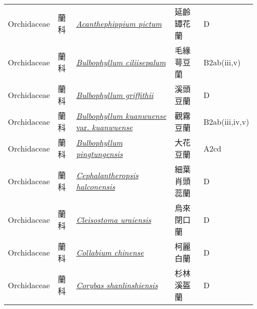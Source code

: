 {\begin{longtable}{p{2.5cm}p{2.5cm}p{4.5cm}p{2.5cm}p{3cm}}
    Orchidaceae & 蘭科 & \href{http://www.theplantlist.org/tpl1.1/search?q=Acanthephippium+pictum}{\textit{Acanthephippium pictum} } & 延齡罈花蘭 & D \index{Acanthephippium@\textit{Acanthephippium}!pictum@\textit{pictum}}  \index{延齡罈花蘭} \\
    Orchidaceae & 蘭科 & \href{http://www.theplantlist.org/tpl1.1/search?q=Bulbophyllum+ciliisepalum}{\textit{Bulbophyllum ciliisepalum} } & 毛緣萼豆蘭 & B2ab(iii,v) \index{Bulbophyllum@\textit{Bulbophyllum}!ciliisepalum@\textit{ciliisepalum}}  \index{毛緣萼豆蘭} \\
    Orchidaceae & 蘭科 & \href{http://www.theplantlist.org/tpl1.1/search?q=Bulbophyllum+griffithii}{\textit{Bulbophyllum griffithii} } & 溪頭豆蘭 & D \index{Bulbophyllum@\textit{Bulbophyllum}!griffithii@\textit{griffithii}}  \index{溪頭豆蘭} \\
    Orchidaceae & 蘭科 & \href{http://www.theplantlist.org/tpl1.1/search?q=Bulbophyllum+kuanwuense+var.+kuanwuense}{\textit{Bulbophyllum kuanwuense} var. \textit{kuanwuense} } & 觀霧豆蘭 & B2ab(iii,iv,v) \index{Bulbophyllum@\textit{Bulbophyllum}!kuanwuense@\textit{kuanwuense}!var. kuanwuense@var. \textit{kuanwuense}}  \index{觀霧豆蘭} \\
    Orchidaceae & 蘭科 & \href{http://www.theplantlist.org/tpl1.1/search?q=Bulbophyllum+pingtungensis}{\textit{Bulbophyllum pingtungensis} } & 大花豆蘭 & A2cd \index{Bulbophyllum@\textit{Bulbophyllum}!pingtungensis@\textit{pingtungensis}}  \index{大花豆蘭} \\
    Orchidaceae & 蘭科 & \href{http://www.theplantlist.org/tpl1.1/search?q=Cephalantheropsis+halconensis}{\textit{Cephalantheropsis halconensis} } & 細葉肖頭蕊蘭 & D \index{Cephalantheropsis@\textit{Cephalantheropsis}!halconensis@\textit{halconensis}}  \index{細葉肖頭蕊蘭} \\
    Orchidaceae & 蘭科 & \href{http://www.theplantlist.org/tpl1.1/search?q=Cleisostoma+uraiensis}{\textit{Cleisostoma uraiensis} } & 烏來閉口蘭 & D \index{Cleisostoma@\textit{Cleisostoma}!uraiensis@\textit{uraiensis}}  \index{烏來閉口蘭} \\
    Orchidaceae & 蘭科 & \href{http://www.theplantlist.org/tpl1.1/search?q=Collabium+chinense}{\textit{Collabium chinense} } & 柯麗白蘭 & D \index{Collabium@\textit{Collabium}!chinense@\textit{chinense}}  \index{柯麗白蘭} \\
    Orchidaceae & 蘭科 & \href{http://www.theplantlist.org/tpl1.1/search?q=Corybas+shanlinshiensis}{\textit{Corybas shanlinshiensis} } & 杉林溪盔蘭 & D \index{Corybas@\textit{Corybas}!shanlinshiensis@\textit{shanlinshiensis}}  \index{杉林溪盔蘭} \\

\end{longtable}}
